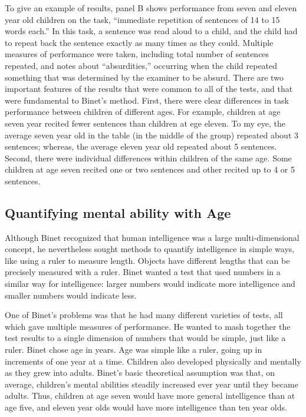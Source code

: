 \documentclass[
  oneside,
  12pt]{crumpbook}
\begin{document}
To give an example of results, panel B shows performance from seven and eleven year old children on the task, ``immediate repetition of sentences of 14 to 15 words each.'' In this task, a sentence was read aloud to a child, and the child had to repeat back the sentence exactly as many times as they could. Multiple measures of performance were taken, including total number of sentences repeated, and notes about ``absurdities,'' occurring when the child repeated something that was determined by the examiner to be absurd. There are two important features of the results that were common to all of the tests, and that were fundamental to Binet's method. First, there were clear differences in task performance between children of different ages. For example, children at age seven year recited fewer sentences than children at ege eleven. To my eye, the average seven year old in the table (in the middle of the group) repeated about 3 sentences; whereas, the average eleven year old repeated about 5 sentences. Second, there were individual differences within children of the same age. Some children at age seven recited one or two sentences and other recited up to 4 or 5 sentences.

\hypertarget{quantifying-mental-ability-with-age}{%
\subsection{Quantifying mental ability with Age}\label{quantifying-mental-ability-with-age}}

Although Binet recognized that human intelligence was a large multi-dimensional concept, he nevertheless sought methods to quantify intelligence in simple ways, like using a ruler to measure length. Objects have different lengths that can be precisely measured with a ruler. Binet wanted a test that used numbers in a similar way for intelligence: larger numbers would indicate more intelligence and smaller numbers would indicate less.

One of Binet's problems was that he had many different varieties of tests, all which gave multiple measures of performance. He wanted to mash together the test results to a single dimension of numbers that would be simple, just like a ruler. Binet chose age in years. Age was simple like a ruler, going up in increments of one year at a time. Children also developed physically and mentally as they grew into adults. Binet's basic theoretical assumption was that, on average, children's mental abilities steadily increased ever year until they became adults. Thus, children at age seven would have more general intelligence than at age five, and eleven year olds would have more intelligence than ten year olds.
\end{document}

